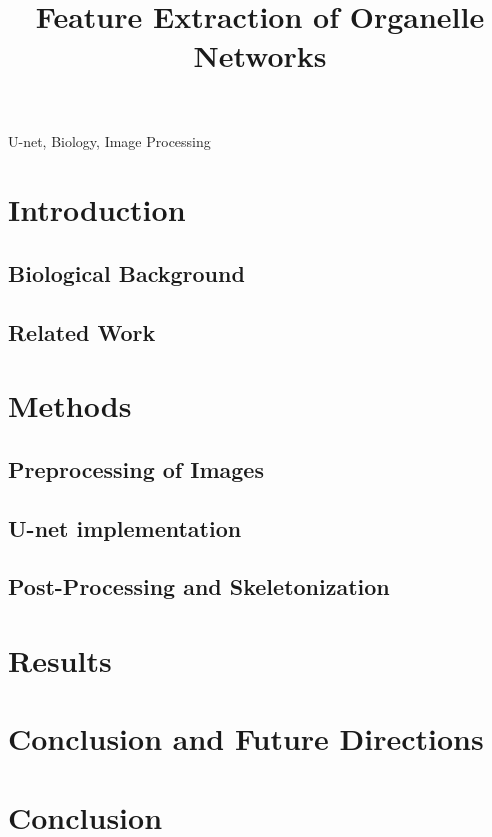 \documentclass{article}
\title{Feature Extraction of Organelle Networks}
\newcommand{\squeeze}{\vspace*{-0ex}}
\newcommand{\squeezemore}{\vspace*{-0ex}}
\begin{document}
\maketitle
\begin{abstract}

\end{abstract}

{\keywords U-net, Biology, Image Processing}
\squeeze
\section{Introduction}
\squeeze

\subsection{Biological Background}


\squeeze
\subsection{Related Work}


%
%
%


\squeezemore
\section{Methods}
\squeeze
\subsection{Preprocessing of Images}
\subsection{U-net implementation}
\subsection{Post-Processing and Skeletonization}


\squeeze
\section{Results}
\label{se:examples}
\squeeze


\section{Conclusion and Future Directions}




\squeeze
\section{Conclusion}
\squeeze

\clearpage
%
%
\end{document}
